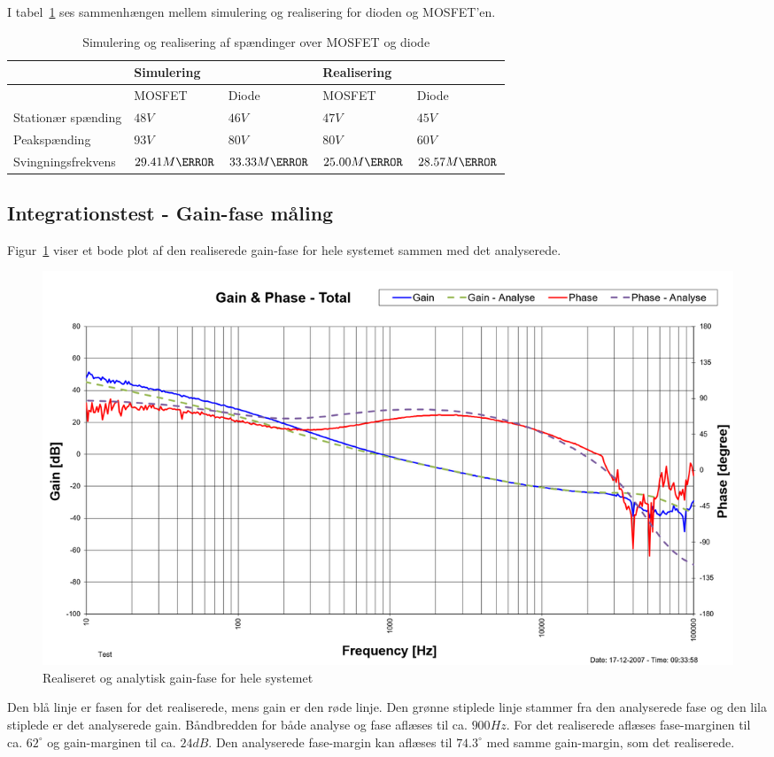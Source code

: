 \noindent I tabel~\ref{tab:MOSDIODE} ses sammenhængen mellem simulering og realisering for dioden og MOSFET'en.
\begin{table}[H] 			
	\centering
	\begin{tabularx}{\textwidth}{|X|l|l|l|l|}
		\hline
		& \multicolumn{2}{|X|}{\textbf{Simulering}} & \multicolumn{2}{|X|}{\textbf{Realisering}} \\ \hline
		& MOSFET & Diode & MOSFET & Diode \\ \hline
		Stationær spænding & $48V$ & $46V$ & $47V$ & $45V$ \\ \hline
		Peakspænding & $93V$ & $80V$ & $80V$ & $60V$ \\ \hline
		Svingningsfrekvens & $29.41M\hertz$ & $33.33M\hertz$ & $25.00M\hertz$ & $28.57M\hertz$ \\ \hline
	\end{tabularx}
	\caption{Simulering og realisering af spændinger over MOSFET og diode}
	\label{tab:MOSDIODE}
\end{table}

\clearpage

\subsection{Integrationstest - Gain-fase måling}
Figur~\ref{fig:realisering_gain_fase_tot} viser et bode plot af den realiserede gain-fase for hele systemet sammen med det analyserede.
\begin{figure}[H]
	\center
	\includegraphics[max width=0.7\linewidth]{../dokumentation/tex/2iteration/billeder/Realisering/Realisering_gain_fase_tot.png}
	\caption{Realiseret og analytisk gain-fase for hele systemet}
	\label{fig:realisering_gain_fase_tot}
\end{figure}
\noindent Den blå linje er fasen for det realiserede, mens gain er den røde linje. Den grønne stiplede linje stammer fra den analyserede fase og den lila stiplede er det analyserede gain. Båndbredden for både analyse og fase aflæses til ca. $900Hz$. For det realiserede aflæses fase-marginen til ca. $62^\circ$ og gain-marginen til ca. $24dB$. Den analyserede fase-margin kan aflæses til $74.3^\circ$ med samme gain-margin, som det realiserede.

